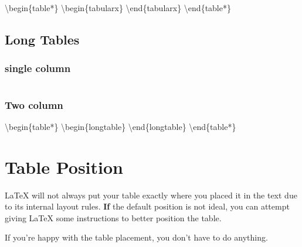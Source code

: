 \documentclass[
  letterpaper,
  DIV=11,
  numbers=noendperiod]{scrreprt}
\newenvironment{Shaded}{\begin{snugshade}}{\end{snugshade}}
\newcommand{\NormalTok}[1]{\textcolor[rgb]{0.00,0.23,0.31}{#1}}
\begin{document}
\begin{Shaded}
\begin{Highlighting}[]
\NormalTok{\textbackslash{}begin\{table*\}}
\NormalTok{  \textbackslash{}begin\{tabularx\}}
\NormalTok{  \textbackslash{}end\{tabularx\}}
\NormalTok{\textbackslash{}end\{table*\}}
\end{Highlighting}
\end{Shaded}

\subsection*{Long Tables}\label{long-tables}

\subsubsection*{single column}\label{single-column}

\begin{verbatim}
\end{verbatim}

\subsubsection*{Two column}\label{two-column}

\begin{Shaded}
\begin{Highlighting}[]
\NormalTok{\textbackslash{}begin\{table*\}}
\NormalTok{  \textbackslash{}begin\{longtable\}}
\NormalTok{  \textbackslash{}end\{longtable\}}
\NormalTok{\textbackslash{}end\{table*\}}
\end{Highlighting}
\end{Shaded}

\section*{Table Position}\label{table-position}


LaTeX will not always put your table exactly where you placed it in the
text due to its internal layout rules. \textbf{If} the default position
is not ideal, you can attempt giving LaTeX some instructions to better
position the table.

If you're happy with the table placement, you don't have to do anything.
\end{document}
